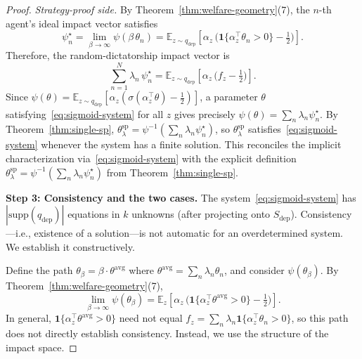 \begin{proof}
    \emph{Strategy-proof side.} By Theorem~\ref{thm:welfare-geometry}(7), 
    the $n$-th agent's ideal impact vector satisfies
    \begin{equation}
        \psi_n^\star 
        = \lim_{\beta \to \infty} \psi(\beta\,\theta_n)
        = \mathbb{E}_{z \sim q_{\mathrm{dep}}}\!\left[
            \alpha_z\,
            \bigl(\mathbf{1}\{\alpha_z^\top \theta_n > 0\} - \tfrac{1}{2}\bigr)
        \right].
    \end{equation}
    Therefore, the random-dictatorship impact vector is
    \begin{equation}\label{eq:rd-impact}
        \sum_{n=1}^N \lambda_n \,\psi_n^\star
        = \mathbb{E}_{z \sim q_{\mathrm{dep}}}\!\left[
            \alpha_z\,\bigl(f_z - \tfrac{1}{2}\bigr)
        \right].
    \end{equation}
    Since $\psi(\theta) = \mathbb{E}_{z \sim q_{\mathrm{dep}}}
    [\alpha_z(\sigma(\alpha_z^\top \theta) - \frac{1}{2})]$, 
    a parameter $\theta$ satisfying~\eqref{eq:sigmoid-system} 
    for all $z$ gives precisely 
    $\psi(\theta) = \sum_n \lambda_n \psi_n^\star$.
    By Theorem~\ref{thm:single-sp}, 
    $\theta^{\mathrm{sp}}_\lambda = \psi^{-1}(\sum_n \lambda_n \psi_n^\star)$, 
    so $\theta^{\mathrm{sp}}_\lambda$ satisfies~\eqref{eq:sigmoid-system} 
    whenever the system has a finite solution.
    This reconciles the implicit characterization 
    via~\eqref{eq:sigmoid-system} with the explicit definition 
    $\theta^{\mathrm{sp}}_\lambda = \psi^{-1}(\sum_n \lambda_n \psi_n^\star)$ 
    from Theorem~\ref{thm:single-sp}.

    \medskip
    \noindent\textbf{Step 3: Consistency and the two cases.}
    The system~\eqref{eq:sigmoid-system} has 
    $|\mathrm{supp}(q_{\mathrm{dep}})|$ equations in $k$ unknowns 
    (after projecting onto $S_{\mathrm{dep}}$). Consistency---i.e., 
    existence of a solution---is not automatic for an overdetermined 
    system. We establish it constructively.

    Define the path $\theta_\beta = \beta \cdot \theta^{\mathrm{avg}}$ 
    where $\theta^{\mathrm{avg}} = \sum_n \lambda_n \theta_n$, 
    and consider $\psi(\theta_\beta)$. By 
    Theorem~\ref{thm:welfare-geometry}(7),
    \begin{equation}
        \lim_{\beta \to \infty} \psi(\theta_\beta) 
        = \mathbb{E}_z\!\left[\alpha_z\,
        \bigl(\mathbf{1}\{\alpha_z^\top \theta^{\mathrm{avg}} > 0\} 
        - \tfrac{1}{2}\bigr)\right].
    \end{equation}
    In general, 
    $\mathbf{1}\{\alpha_z^\top \theta^{\mathrm{avg}} > 0\}$ need 
    not equal $f_z = \sum_n \lambda_n \mathbf{1}\{\alpha_z^\top \theta_n > 0\}$, 
    so this path does not directly establish consistency. Instead, we 
    use the structure of the impact space.


\end{proof}
